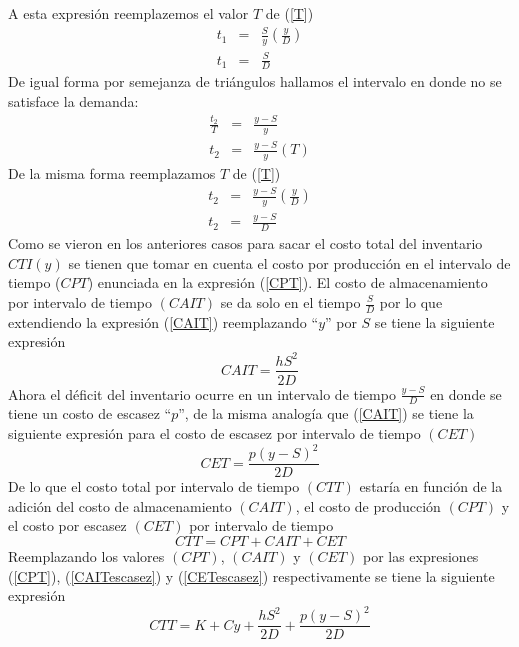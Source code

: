 A esta expresión reemplazemos el valor $T$ de (\ref{T})
\begin{eqnarray}
	t_1 &=& \frac{S}{y} \left( \frac{y}{D} \right) \nonumber \\
	t_1 &=& \frac{S}{D}
\end{eqnarray}
De igual forma por semejanza de triángulos hallamos el intervalo en donde no se satisface la demanda:
\begin{eqnarray}
	\frac{t_2}{T} &=& \frac{y-S}{y} \nonumber \\
	t_2 &=& \frac{y-S}{y}(T) \nonumber
\end{eqnarray}
\newpage
\noindent De la misma forma reemplazamos $T$ de (\ref{T})
\begin{eqnarray}
	t_2 &=& \frac{y-S}{y} \left( \frac{y}{D} \right) \nonumber \\
	t_2 &=& \frac{y-S}{D}
\end{eqnarray}
Como se vieron en los anteriores casos para sacar el costo total del inventario $CTI(y)$ se tienen que tomar en cuenta el costo por producción en el intervalo de tiempo ($CPT$) enunciada en la expresión (\ref{CPT}). El costo de almacenamiento por intervalo de tiempo $(CAIT)$ se da solo en el tiempo $\frac{S}{D}$ por lo que extendiendo la expresión (\ref{CAIT}) reemplazando ``$y$'' por $S$ se tiene la siguiente expresión
\begin{equation}
	\label{CAITescasez}
	CAIT = \frac{hS^2}{2D}
\end{equation}
Ahora el déficit del inventario ocurre en un intervalo de tiempo $\frac{y-S}{D}$ en donde se tiene un costo de escasez ``$p$'', de la misma analogía que (\ref{CAIT}) se tiene la siguiente expresión para el costo de escasez por intervalo de tiempo $(CET)$
\begin{equation}
	\label{CETescasez}
	CET = \frac{p{(y-S)}^{2}}{2D} 	
\end{equation} 
De lo que el costo total por intervalo de tiempo $(CTT)$ estaría en función de la adición del costo de almacenamiento $(CAIT)$, el costo de producción $(CPT)$ y el costo por escasez $(CET)$ por intervalo de tiempo
\begin{equation}
	CTT = CPT + CAIT + CET
\end{equation}
Reemplazando los valores $(CPT)$, $(CAIT)$ y $(CET)$ por las expresiones (\ref{CPT}), (\ref{CAITescasez}) y (\ref{CETescasez}) respectivamente se tiene la siguiente expresión
\begin{equation}
	CTT = K + Cy + \frac{hS^2}{2D} + \frac{p{(y-S)}^{2}}{2D}
\end{equation}
